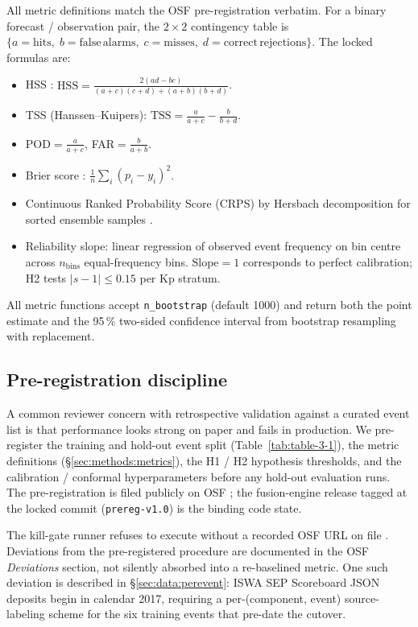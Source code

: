 \documentclass[11pt,letterpaper]{article}
\begin{document}
All metric definitions match the OSF pre-registration \cite{osf_prereg}
verbatim.  For a binary forecast / observation pair, the
$2\times 2$ contingency table is
$\{a=\mathrm{hits},\;b=\mathrm{false\,alarms},\;c=\mathrm{misses},\;d=\mathrm{correct\,rejections}\}$.
The locked formulas are:
\begin{itemize}[leftmargin=*,itemsep=0pt]
  \item HSS \cite{donaldson1975}:
    $\mathrm{HSS} = \frac{2(ad-bc)}{(a+c)(c+d) + (a+b)(b+d)}$.
  \item TSS (Hanssen--Kuipers): $\mathrm{TSS} = \frac{a}{a+c} - \frac{b}{b+d}$.
  \item POD$= \frac{a}{a+c}$, FAR$= \frac{b}{a+b}$.
  \item Brier score \cite{brier1950}: $\frac{1}{n}\sum_i (p_i - y_i)^2$.
  \item Continuous Ranked Probability Score (CRPS) by Hersbach
        decomposition for sorted ensemble samples \cite{hersbach2000}.
  \item Reliability slope: linear regression of observed event frequency on
        bin centre across $n_\mathrm{bins}$ equal-frequency bins.  Slope$=1$
        corresponds to perfect calibration; H2 tests
        $|s-1| \le 0.15$ per Kp stratum.
\end{itemize}
All metric functions accept \texttt{n\_bootstrap} (default 1000) and return
both the point estimate and the 95\,\% two-sided confidence interval from
bootstrap resampling with replacement.

\subsection{Pre-registration discipline}
\label{sec:methods:prereg}

A common reviewer concern with retrospective validation against a curated
event list is that performance looks strong on paper and fails in production.
We pre-register the training and hold-out event split (Table~\ref{tab:table-3-1}),
the metric definitions (§\ref{sec:methods:metrics}), the H1 / H2 hypothesis
thresholds, and the calibration / conformal hyperparameters before any
hold-out evaluation runs.  The pre-registration is filed publicly on OSF
\cite{osf_prereg}; the fusion-engine release tagged at the locked commit
(\texttt{prereg-v1.0}) is the binding code state.

The kill-gate runner refuses to execute without a recorded OSF URL on file
\cite{helios_fusion_engine}.  Deviations from the pre-registered procedure
are documented in the OSF \emph{Deviations} section, not silently absorbed
into a re-baselined metric.  One such deviation is described in
§\ref{sec:data:perevent}: ISWA SEP Scoreboard JSON deposits begin in
calendar 2017, requiring a per-(component, event) source-labeling scheme
for the six training events that pre-date the cutover.
\end{document}
